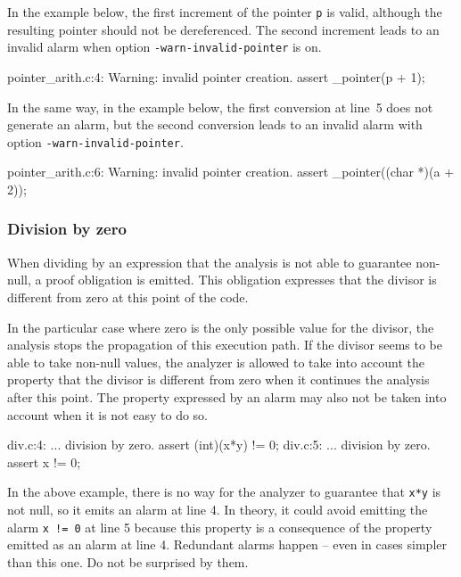 \documentclass[web]{frama-c-book}
\begin{document}
In the example below, the first increment of the pointer \lstinline|p| is valid,
although the resulting pointer should not be dereferenced. The second increment
leads to an invalid alarm when option \lstinline|-warn-invalid-pointer| is on.
\begin{logs}
   pointer_arith.c:4: Warning:
    invalid pointer creation. assert \object_pointer(p + 1);
\end{logs}

In the same way, in the example below, the first conversion at line~5
does not generate an alarm, but the second conversion leads to an invalid alarm
with option \lstinline|-warn-invalid-pointer|.

\begin{logs}
   pointer_arith.c:6: Warning:
    invalid pointer creation. assert \object_pointer((char *)(a + 2));
\end{logs}


\subsubsection{Division by zero}
When dividing by an expression that the analysis
is not able to guarantee non-null, a proof
obligation is emitted. This obligation expresses that the divisor
is different from zero at this point of the code. 

In the particular case where zero is the only possible value
for the divisor, the analysis stops the propagation of this 
execution path.
If the divisor seems to be able to take non-null values,
the analyzer
is allowed to take into account the
property that the divisor is different from zero when it continues
the analysis after this point.
The property expressed by an alarm may also not be taken into account
when it is not easy to do so.
\begin{logs}
div.c:4: ... division by zero. assert (int)(x*y) != 0;
div.c:5: ... division by zero. assert x != 0;
\end{logs}
In the above example, there is no way for the analyzer
to guarantee that \lstinline|x*y| is not null, so it emits
an alarm at line 4. In theory, it could avoid emitting
the alarm \lstinline|x != 0| at line 5 
because this property is a consequence of the property emitted
as an alarm at line 4. Redundant alarms happen -- even in cases
simpler than this one. Do not be surprised by them.
\end{document}
